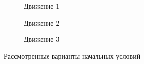



\begin{figure}
    \centering
    \begin{subfigure}[t]{0.3\textwidth}
        \centering
        \caption{Движение $1$}
        \label{fig:nu_impact_1}
    \end{subfigure}
    \quad
    \begin{subfigure}[t]{0.3\textwidth}
        \centering
        \caption{Движение $2$}
        \label{fig:nu_impact_2}
    \end{subfigure}
    \quad
    \begin{subfigure}[t]{0.3\textwidth}
        \centering
        \caption{Движение $3$}
        \label{fig:nu_impact_3}
    \end{subfigure}
    \caption{Рассмотренные варианты начальных условий}
    \label{fig:nu_impact}
\end{figure}

